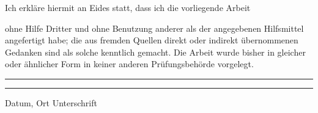 \begin{otherlanguage}{ngerman}

Ich erkläre hiermit an Eides statt, dass ich die vorliegende Arbeit
  \begin{quote}
    \glqq{}\textit{\thetitle{}}\grqq{}
  \end{quote}
  ohne Hilfe Dritter und ohne Benutzung anderer als der angegebenen
    Hilfsmittel angefertigt habe; die aus fremden Quellen direkt oder
    indirekt übernommenen Gedanken sind als solche kenntlich gemacht.
  Die Arbeit wurde bisher in gleicher oder ähnlicher Form in keiner anderen
    Prüfungsbehörde vorgelegt.
\end{otherlanguage}


\vspace{4cm}

\noindent\rule{5cm}{.4pt}\hfill\rule{5cm}{.4pt}\par
\noindent Datum, Ort \hfill Unterschrift
